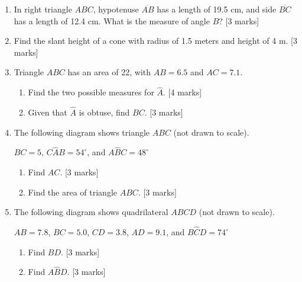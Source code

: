 \documentclass[12pt, twoside]{article}
\begin{document}
\begin{enumerate}
  \item In right triangle $ABC$, hypotenuse $\overline{AB}$ has a length of 19.5 cm, and side $\overline{BC}$ has a length of 12.4 cm. What is the measure of angle $B$? \hfill [3 marks]
  
  \item Find the slant height of a cone with radius of 1.5 meters and height of 4 m. \hfill [3 marks]
  
  \item Triangle $ABC$ has an area of 22, with $AB=6.5$ and $AC=7.1$. 
  \begin{enumerate}
    \item Find the two possible measures for $\hat{A}$. \hfill [4 marks]
    \item Given that $\hat{A}$ is obtuse, find $BC$. \hfill [3 marks]
  \end{enumerate}

   \newpage

  \item The following diagram shows triangle $ABC$ (not drawn to scale).
  \begin{center}
    \end{center} 
    $BC=5$, $C\hat{A}B=54^\circ$, and $A\hat{B}C=48^\circ$
    \begin{enumerate}
      \item Find $AC$. \hfill [3 marks]
      \item Find the area of triangle $ABC$. \hfill [3 marks]
    \end{enumerate}

    \item The following diagram shows quadrilateral $ABCD$ (not drawn to scale).
  \begin{center}
    \end{center} 
    $AB=7.8$, $BC=5.0$, $CD=3.8$, $AD=9.1$, and $B\hat{C}D=74^\circ$
    \begin{enumerate}
      \item Find $BD$. \hfill [3 marks]
      \item Find $A\hat{B}D$. \hfill [3 marks]
    \end{enumerate}


\end{enumerate}
\end{document}
